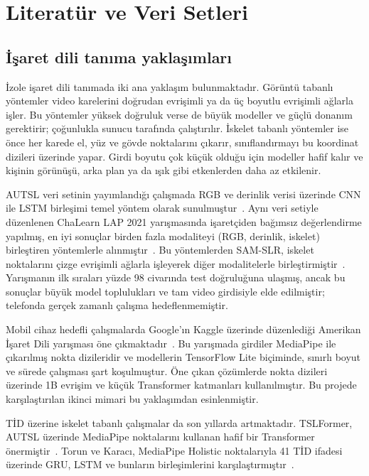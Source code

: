 \section{Literatür ve Veri Setleri}
\label{CH:Literatur}

\subsection{İşaret dili tanıma yaklaşımları}

İzole işaret dili tanımada iki ana yaklaşım bulunmaktadır. Görüntü tabanlı
yöntemler video karelerini doğrudan evrişimli ya da üç boyutlu evrişimli ağlarla
işler. Bu yöntemler yüksek doğruluk verse de büyük modeller ve güçlü donanım
gerektirir; çoğunlukla sunucu tarafında çalıştırılır. İskelet tabanlı yöntemler ise
önce her karede el, yüz ve gövde noktalarını çıkarır, sınıflandırmayı bu koordinat
dizileri üzerinde yapar. Girdi boyutu çok küçük olduğu için modeller hafif kalır ve
kişinin görünüşü, arka plan ya da ışık gibi etkenlerden daha az etkilenir.

AUTSL veri setinin yayımlandığı çalışmada RGB ve derinlik verisi üzerinde CNN ile
LSTM birleşimi temel yöntem olarak sunulmuştur~\cite{AUTSL2020}. Aynı veri setiyle
düzenlenen ChaLearn LAP 2021 yarışmasında işaretçiden bağımsız değerlendirme
yapılmış, en iyi sonuçlar birden fazla modaliteyi (RGB, derinlik, iskelet) birleştiren
yöntemlerle alınmıştır~\cite{ChaLearn2021}. Bu yöntemlerden SAM-SLR, iskelet
noktalarını çizge evrişimli ağlarla işleyerek diğer modalitelerle
birleştirmiştir~\cite{SAMSLR2021}. Yarışmanın ilk sıraları yüzde 98 civarında test
doğruluğuna ulaşmış, ancak bu sonuçlar büyük model toplulukları ve tam video girdisiyle
elde edilmiştir; telefonda gerçek zamanlı çalışma hedeflenmemiştir.

Mobil cihaz hedefli çalışmalarda Google'ın Kaggle üzerinde düzenlediği Amerikan
İşaret Dili yarışması öne çıkmaktadır~\cite{KaggleASL2023}. Bu yarışmada girdiler
MediaPipe ile çıkarılmış nokta dizileridir ve modellerin TensorFlow Lite biçiminde,
sınırlı boyut ve sürede çalışması şart koşulmuştur. Öne çıkan çözümlerde nokta
dizileri üzerinde 1B evrişim ve küçük Transformer katmanları kullanılmıştır. Bu
projede karşılaştırılan ikinci mimari bu yaklaşımdan esinlenmiştir.

TİD üzerine iskelet tabanlı çalışmalar da son yıllarda artmaktadır. TSLFormer,
AUTSL üzerinde MediaPipe noktalarını kullanan hafif bir Transformer
önermiştir~\cite{TSLFormer2025}. Torun ve Karacı, MediaPipe Holistic noktalarıyla 41
TİD ifadesi üzerinde GRU, LSTM ve bunların birleşimlerini
karşılaştırmıştır~\cite{Torun2024}.

